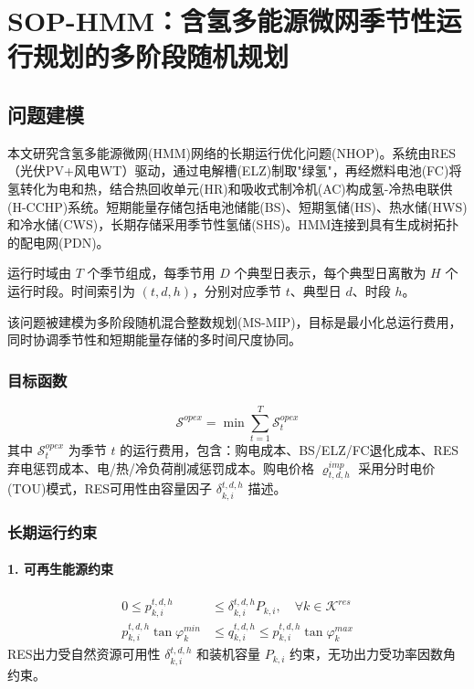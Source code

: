 \documentclass[11pt]{ctexart}
\begin{document}
\section{SOP-HMM：含氢多能源微网季节性运行规划的多阶段随机规划}

\subsection{问题建模}

本文研究含氢多能源微网(HMM)网络的长期运行优化问题(NHOP)。系统由RES（光伏PV+风电WT）驱动，通过电解槽(ELZ)制取"绿氢"，再经燃料电池(FC)将氢转化为电和热，结合热回收单元(HR)和吸收式制冷机(AC)构成氢-冷热电联供(H-CCHP)系统。短期能量存储包括电池储能(BS)、短期氢储(HS)、热水储(HWS)和冷水储(CWS)，长期存储采用季节性氢储(SHS)。HMM连接到具有生成树拓扑的配电网(PDN)。

运行时域由 $T$ 个季节组成，每季节用 $D$ 个典型日表示，每个典型日离散为 $H$ 个运行时段。时间索引为 $(t, d, h)$，分别对应季节 $t$、典型日 $d$、时段 $h$。

该问题被建模为多阶段随机混合整数规划(MS-MIP)，目标是最小化总运行费用，同时协调季节性和短期能量存储的多时间尺度协同。

\subsubsection{目标函数}
\begin{equation}
    \mathcal{S}^{opex} = \min \sum_{t=1}^{T} \mathcal{S}_t^{opex}
\end{equation}
其中 $\mathcal{S}_t^{opex}$ 为季节 $t$ 的运行费用，包含：购电成本、BS/ELZ/FC退化成本、RES弃电惩罚成本、电/热/冷负荷削减惩罚成本。购电价格 $\varrho_{t,d,h}^{imp}$ 采用分时电价(TOU)模式，RES可用性由容量因子 $\delta_{k,i}^{t,d,h}$ 描述。

\subsubsection{长期运行约束}

\paragraph{1. 可再生能源约束}
\begin{align}
    0 \le p_{k,i}^{t,d,h} &\le \delta_{k,i}^{t,d,h} P_{k,i}, \quad \forall k \in \mathcal{K}^{res} \\
    p_{k,i}^{t,d,h} \tan \varphi_k^{min} &\le q_{k,i}^{t,d,h} \le p_{k,i}^{t,d,h} \tan \varphi_k^{max}
\end{align}
RES出力受自然资源可用性 $\delta_{k,i}^{t,d,h}$ 和装机容量 $P_{k,i}$ 约束，无功出力受功率因数角约束。
\end{document}

